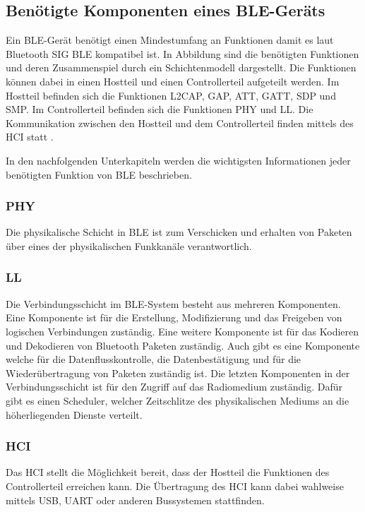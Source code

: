 \subsection{Benötigte Komponenten eines \ac{BLE}-Geräts}

Ein \ac{BLE}-Gerät benötigt einen Mindestumfang an Funktionen damit es laut Bluetooth \ac{SIG} \ac{BLE} kompatibel ist. In Abbildung  sind die benötigten Funktionen und deren Zusammenspiel durch ein Schichtenmodell dargestellt. Die Funktionen können dabei in einen Hostteil und einen Controllerteil aufgeteilt werden. Im Hostteil befinden sich die Funktionen \ac{L2CAP}, \ac{GAP}, \ac{ATT}, \ac{GATT}, \ac{SDP} und \ac{SMP}. Im Controllerteil befinden sich die Funktionen \ac{PHY} und \ac{LL}. Die Kommunikation zwischen den Hostteil und dem Controllerteil finden mittels des \ac{HCI} statt \cite[S.~1735]{bluetoothCore}. \cite[S.~193]{bluetoothCore}


In den nachfolgenden Unterkapiteln werden die wichtigsten Informationen jeder benötigten Funktion von \ac{BLE} beschrieben.

\subsubsection{\acf{PHY}}
Die physikalische Schicht in \ac{BLE} ist zum Verschicken und erhalten von Paketen über eines der physikalischen Funkkanäle verantwortlich. \cite[S.~209]{bluetoothCore}

\subsubsection{\acf{LL}}
Die Verbindungsschicht im \ac{BLE}-System besteht aus mehreren Komponenten. Eine Komponente ist für die Erstellung, Modifizierung und das Freigeben von logischen Verbindungen zuständig. Eine weitere Komponente ist für das Kodieren und Dekodieren von Bluetooth Paketen zuständig. Auch gibt es eine Komponente welche für die Datenflusskontrolle, die Datenbestätigung und für die Wiederübertragung von Paketen zuständig ist. Die letzten Komponenten in der Verbindungsschicht ist für den Zugriff auf das Radiomedium zuständig. Dafür gibt es einen Scheduler, welcher Zeitschlitze des physikalischen Mediums an die höherliegenden Dienste verteilt. \cite[S.~207f.]{bluetoothCore}

\subsubsection{\acf{HCI}}
Das \acl{HCI} stellt die Möglichkeit bereit, dass der Hostteil die Funktionen des Controllerteil erreichen kann. Die Übertragung des \ac{HCI} kann dabei wahlweise mittels USB, UART oder anderen Bussystemen stattfinden. \cite[S.~1735f.]{bluetoothCore}

